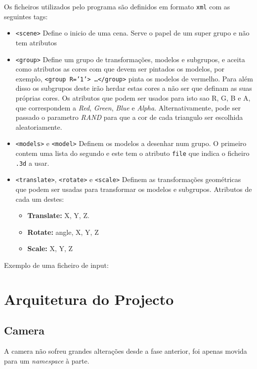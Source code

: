 \documentclass[a4paper]{article}
\begin{document}
Os ficheiros utilizados pelo programa são definidos em formato \texttt{xml} com as seguintes tags:
\begin{itemize}
    \item \texttt{<scene>} Define o inicio de uma cena. Serve o papel de um
        super grupo e não tem atributos
    \item \texttt{<group>} Define um grupo de transformações, modelos e
        subgrupos, e aceita como atributos as cores com que devem ser pintados
        os modelos, por exemplo,
        \texttt{<group R='1'> \ldots </group>} pinta os modelos de vermelho.
        Para além disso os subgrupos deste irão herdar estas cores a não ser
        que definam as suas próprias cores. Os atributos que podem ser usados
        para isto sao R, G, B e A, que correspondem a \textit{Red},
        \textit{Green}, \textit{Blue} e \textit{Alpha}. Alternativamente, pode ser passado
        o parametro \textit{RAND} para que a cor de cada triangulo ser
        escolhida aleatoriamente.
    \item \texttt{<models>} e \texttt{<model>} Definem os modelos a desenhar
        num grupo. O primeiro contem uma lista do segundo e este tem o atributo
        \texttt{file} que indica o ficheiro \texttt{.3d} a usar.
    \item \texttt{<translate>}, \texttt{<rotate>} e \texttt{<scale>} Definem as
        transformações geométricas que podem ser usadas para transformar os
        modelos e subgrupos. Atributos de cada um destes:
        \begin{itemize}
            \item \textbf{Translate:} X, Y, Z.
            \item \textbf{Rotate:} angle, X, Y, Z
            \item \textbf{Scale:} X, Y, Z
        \end{itemize}
\end{itemize}

Exemplo de uma ficheiro de input:


\section{Arquitetura do Projecto}

\subsection{Camera}

A camera não sofreu grandes alterações desde a fase anterior, foi apenas movida para um \textit{namespace} à parte.
\end{document}
